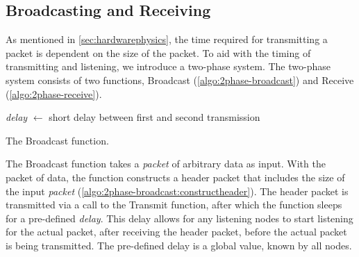 
\subsection{Broadcasting and Receiving}\label{sec:2pcomm}
As mentioned in \autoref{sec:hardwarephysics}, the time required for transmitting a packet is dependent on the
size of the packet. To aid with the timing of transmitting and listening, we introduce a two-phase system. The
two-phase system consists of two functions, Broadcast (\autoref{algo:2phase-broadcast}) and Receive
(\autoref{algo:2phase-receive}). 

\begin{algorithm}[ht]
    \DontPrintSemicolon
    \textit{delay} $\leftarrow$ short delay between first and second transmission\;
    \;

    \caption{The Broadcast function.}
    \label{algo:2phase-broadcast}
\end{algorithm}

The Broadcast function takes a \textit{packet} of arbitrary data as input. With the packet of data, the
function constructs a header packet that includes the size of the input \textit{packet}
(\autoref{algo:2phase-broadcast:constructheader}). The header packet is transmitted via a call to the Transmit
function, after which the function sleeps for a pre-defined \textit{delay}. This delay allows for any
listening nodes to start listening for the actual packet, after receiving the header packet, before the actual
packet is being transmitted. The pre-defined delay is a global value, known by all nodes.

